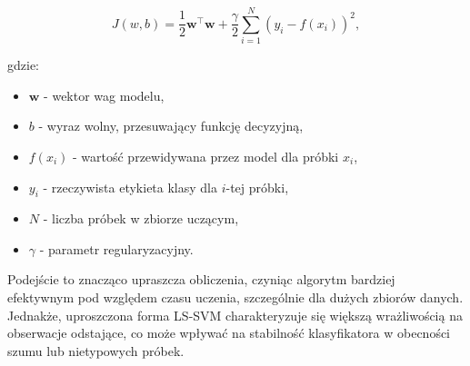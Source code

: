 \documentclass[a4paper,twoside,12pt]{book}
\begin{document}
\begin{equation}
	J(w, b) = \frac{1}{2} \textbf{w}^\top \textbf{w} + \frac{\gamma}{2} \sum_{i=1}^{N} (y_i - f(x_i))^2,
\end{equation}

\noindent gdzie:
\begin{itemize}
	\item $\textbf{w}$ - wektor wag modelu,
	\item $b$ - wyraz wolny, przesuwający funkcję decyzyjną,
	\item $f(x_i)$ - wartość przewidywana przez model dla próbki $x_i$,
	\item $y_i$ - rzeczywista etykieta klasy dla $i$-tej próbki,
	\item $N$ - liczba próbek w zbiorze uczącym,
	\item $\gamma$ - parametr regularyzacyjny.
\end{itemize}


Podejście to znacząco upraszcza obliczenia, czyniąc algorytm bardziej efektywnym pod względem czasu uczenia, szczególnie dla dużych zbiorów danych. Jednakże, uproszczona forma LS-SVM charakteryzuje się większą wrażliwością na obserwacje odstające, co może wpływać na stabilność klasyfikatora w obecności szumu lub nietypowych próbek.
\end{document}

